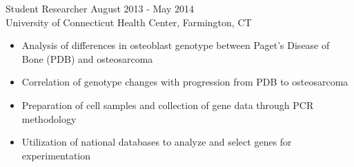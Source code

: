 \documentclass[line, 10pt]{res} %
\begin{document}
\begin{resume}
{\sc \large Student Researcher} \hfill August 2013 - May 2014\\
University of Connecticut Health Center, Farmington, CT
\begin{itemize}
\item Analysis of differences in osteoblast genotype between Paget's Disease of Bone (PDB) and osteosarcoma
\item Correlation of genotype changes with progression from PDB to osteosarcoma
\item Preparation of cell samples and collection of gene data through PCR methodology
\item Utilization of national databases to analyze and select genes for experimentation
\end{itemize} 


\end{resume}
\end{document}

